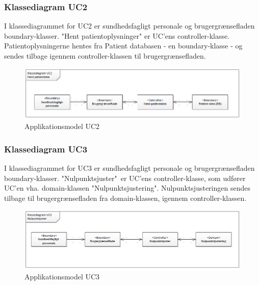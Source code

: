 \subsubsection{Klassediagram UC2}
I klassediagrammet for UC2 er sundhedsfagligt personale og brugergrænsefladen boundary-klasser. "Hent patientoplysninger" er UC'ens controller-klasse. Patientoplysningerne hentes fra Patient databasen - en boundary-klasse - og sendes tilbage igennem controller-klassen til brugergrænsefladen. 
\begin{figure}[H]
\centering
\includegraphics[scale=0.70]{app2.PNG}
\caption{Applikationsmodel UC2}
\end{figure}

\newpage

\subsubsection{Klassediagram UC3}
I klassediagrammet for UC3 er sundhedsfagligt personale og brugergrænsefladen boundary-klasser. "Nulpunktsjuster"\ er UC'ens controller-klasse, som udfører UC'en vha. domain-klassen "Nulpunktsjustering". Nulpunktsjusteringen sendes tilbage til brugergrænsefladen fra domain-klassen, igennem controller-klassen.
\begin{figure}[H]
\centering
\includegraphics[scale=0.70]{app3.PNG}
\caption{Applikationsmodel UC3}
\end{figure}

